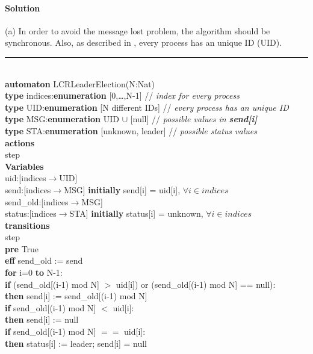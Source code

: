 \documentclass[11pt]{article}
\newcommand{\tab}{\hspace*{5mm}}
\begin{document}
\paragraph{Solution}

(a) In order to avoid the message lost problem, the algorithm should be synchronous. Also, as described in \cite{lynch1996a}, every process has an unique ID (UID).

\noindent\rule{7cm}{1.0pt}\\
\textbf{automaton} LCRLeaderElection(N:Nat)\\
\tab\textbf{type} indices:\textbf{enumeration} [0,\dots,N-1] // \textit{index for every process}\\
\tab\textbf{type} UID:\textbf{enumeration} [N different IDs] // \textit{every process has an unique ID} \\
\tab\textbf{type} MSG:\textbf{enumeration} UID $\cup$ [null] // \textit{possible values in \textbf{send[i]}}\\
\tab\textbf{type} STA:\textbf{enumeration} [unknown, leader] // \textit{possible status values}\\
\tab\textbf{actions}\\
\tab\tab step\\
\tab\textbf{Variables}\\
\tab\tab uid:[indices$\rightarrow$UID]\\
\tab\tab send:[indices$\rightarrow$MSG] \textbf{initially} send[i] = uid[i], $\forall i \in indices$\\
\tab\tab send\_old:[indices$\rightarrow$MSG]\\
\tab\tab status:[indices$\rightarrow$STA] \textbf{initially} status[i] = unknown, $\forall i \in indices$\\
\tab\textbf{transitions}\\
\tab\tab step\\
\tab\tab\tab\textbf{pre} True\\
\tab\tab\tab\textbf{eff} send\_old := send\\
\tab\tab\tab\tab \textbf{for} i=0 \textbf{to} N-1:\\
\tab\tab\tab\tab\tab\textbf{if} (send\_old[(i-1) mod N] $>$ uid[i]) or (send\_old[(i-1) mod N] == null):\\
\tab\tab\tab\tab\tab\textbf{then} send[i] := send\_old[(i-1) mod N]\\
\tab\tab\tab\tab\tab\textbf{if} send\_old[(i-1) mod N] $<$ uid[i]:\\
\tab\tab\tab\tab\tab\textbf{then} send[i] := null\\
\tab\tab\tab\tab\tab\textbf{if} send\_old[(i-1) mod N] $==$ uid[i]:\\
\tab\tab\tab\tab\tab\textbf{then} status[i] := leader; send[i] = null\\
\end{document}
